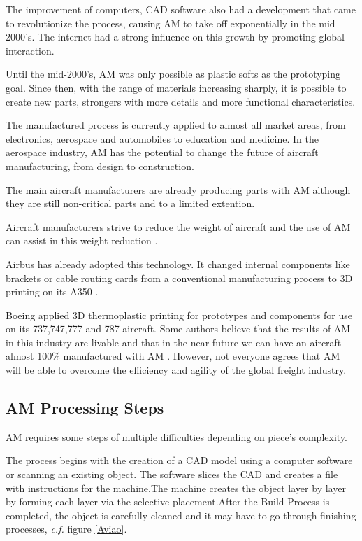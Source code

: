 The improvement of computers, CAD software also had a development that came to revolutionize the process, causing AM to take off exponentially in the mid 2000's. The internet had a strong influence on this growth by promoting global interaction.\cite{wohlers2014history}\par
Until the mid-2000's, AM was only possible as plastic softs as the prototyping goal. Since then, with the range of materials increasing sharply, it is possible to create new parts, strongers with more details and more functional characteristics.\cite{wohlers2014history}\par
The manufactured process is currently applied to almost all market areas, from electronics, aerospace and automobiles to education and medicine.
In the aerospace industry, AM has the potential to change the future of aircraft manufacturing, from design to construction.\par
The main aircraft manufacturers are already producing parts with AM although they are still non-critical parts and to a limited extention.\par 
Aircraft manufacturers strive to reduce the weight of aircraft and the use of AM can assist in this weight reduction \cite{birtchnell2013freight}.\par
Airbus has already adopted this technology. It changed internal components like brackets or cable routing cards from a conventional manufacturing process to 3D printing on its A350 \cite{warwick20153}.\par
Boeing applied 3D thermoplastic printing for prototypes and components for use on its 737,747,777 and 787 aircraft.\cite{walton20146th}
Some authors believe that the results of AM in this industry are livable and that in the near future we can have an aircraft almost 100\% manufactured with AM \cite{walton20146th}\cite{coykendall20143d}. However, not everyone agrees that AM will be able to overcome the efficiency and agility of the global freight industry.\par


\subsection{AM Processing Steps}

AM requires some steps of multiple difficulties depending on piece's complexity.\par
The process begins with the creation of a CAD model using a computer software or scanning an existing object. The software slices the CAD and creates a file with instructions for the machine.The machine creates the object layer by layer by forming each layer via the selective placement.After the Build Process is completed, the object is carefully cleaned and it may have to go through finishing processes, \textit{c.f.} figure \ref{Aviao}.\par

